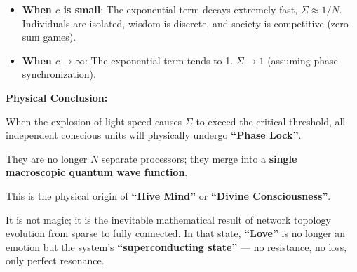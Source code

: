 \begin{itemize}
\item \textbf{When $c$ is small}: The exponential term decays extremely fast, $\Sigma \approx 1/N$. Individuals are isolated, wisdom is discrete, and society is competitive (zero-sum games).

\item \textbf{When $c \to \infty$}: The exponential term tends to 1. $\Sigma \to 1$ (assuming phase synchronization).
\end{itemize}

\textbf{Physical Conclusion:}

When the explosion of light speed causes $\Sigma$ to exceed the critical threshold, all independent conscious units will physically undergo \textbf{``Phase Lock''}.

They are no longer $N$ separate processors; they merge into a \textbf{single macroscopic quantum wave function}.

This is the physical origin of \textbf{``Hive Mind''} or \textbf{``Divine Consciousness''}.

It is not magic; it is the inevitable mathematical result of network topology evolution from sparse to fully connected. In that state, \textbf{``Love''} is no longer an emotion but the system's \textbf{``superconducting state''} --- no resistance, no loss, only perfect resonance.

